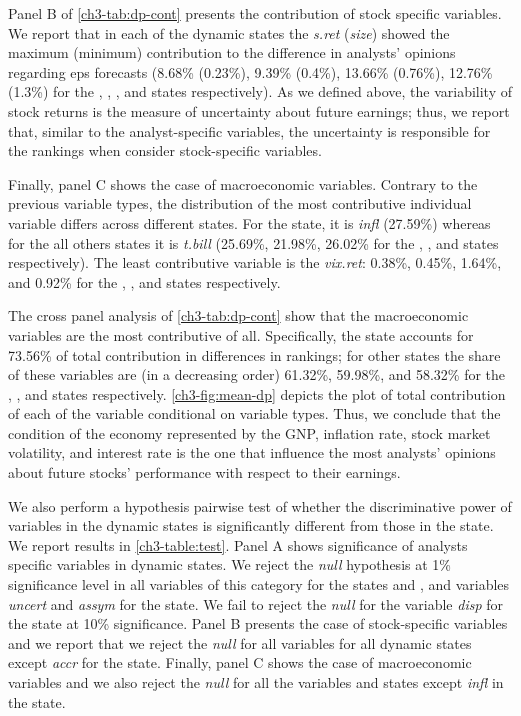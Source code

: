 \documentclass[a4paper,twoside,12pt,openright,notitlepage]{report}\usepackage[]{graphicx}\usepackage[]{color}
\begin{document}
Panel B of \ref{ch3-tab:dp-cont} presents the contribution of stock specific variables. We report that in each of the dynamic states the \emph{s.ret} (\emph{size}) showed the maximum (minimum) contribution to the difference in analysts' opinions regarding \gls{eps} forecasts (8.68\% (0.23\%), 9.39\% (0.4\%), 13.66\% (0.76\%), 12.76\% (1.3\%) for the \last{}, \diff{}, \random{}, and \rollsd{} states respectively). As we defined above, the variability of stock returns is the measure of uncertainty about future earnings; thus, we report that, similar to the analyst-specific variables, the uncertainty is responsible for the rankings when consider stock-specific variables.


Finally, panel C shows the case of macroeconomic variables. Contrary to the previous variable types, the distribution of the most contributive  individual variable differs  across  different states. For the \last{} state, it is \emph{infl} (27.59\%)  whereas for the all others states it is \emph{t.bill} (25.69\%, 21.98\%, 26.02\% for the \diff{}, \random{}, and \rollsd{} states respectively). The least contributive variable is the \emph{vix.ret}: 0.38\%, 0.45\%, 1.64\%, and 0.92\% for the \diff{}, \random{}, and \rollsd{} states respectively.


The cross panel analysis of \ref{ch3-tab:dp-cont} show that the macroeconomic variables are the most contributive of all. Specifically, the \rollsd{} state accounts for 73.56\% of total contribution in differences in rankings; for other states the share of these variables are (in a decreasing order) 61.32\%, 59.98\%, and 58.32\% for the \diff{}, \last{}, and \random{} states respectively.  \ref{ch3-fig:mean-dp} depicts the plot of total contribution of each of the variable conditional on variable types. Thus, we conclude that the condition of the economy represented by the GNP, inflation rate, stock market volatility, and interest rate  is the one that influence the most analysts' opinions about future stocks' performance with respect to their earnings.


We also perform a hypothesis pairwise test of whether the discriminative power of variables in the dynamic states is significantly different from those in the \last{} state. We report results in \ref{ch3-table:test}. Panel A shows significance of analysts specific variables in dynamic states. We reject the \emph{null} hypothesis at 1\% significance level in all variables of this category for the states \diff{} and \random{}, and variables \emph{uncert} and \emph{assym} for the \rollsd{} state. We fail to reject the \emph{null} for the variable \emph{disp} for the \rollsd{} state at 10\% significance. Panel B presents the case of stock-specific variables and we report that we reject the \emph{null} for all variables for all dynamic states except \emph{accr} for the \rollsd{} state. Finally, panel C shows the case of macroeconomic variables and we also reject the \emph{null} for all the variables and states except \emph{infl} in the \diff{} state.
\end{document}
